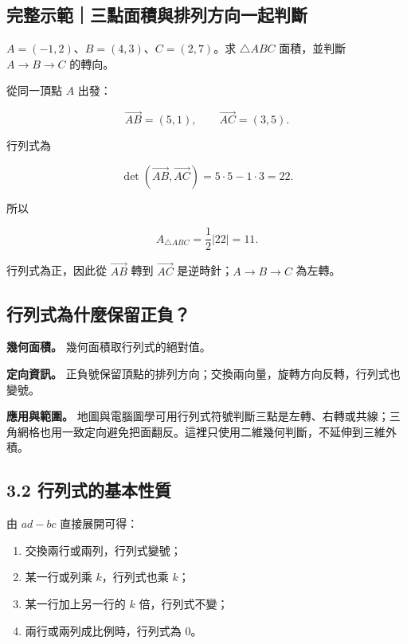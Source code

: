 \documentclass[11pt,a4paper]{article}
\providecommand{\tightlist}{%
  \setlength{\itemsep}{0pt}\setlength{\parskip}{0pt}}
\begin{document}
\begin{HandoutWorkedExample}

\subsection{完整示範｜三點面積與排列方向一起判斷}\label{ux5b8cux6574ux793aux7bc4ux4e09ux9edeux9762ux7a4dux8207ux6392ux5217ux65b9ux5411ux4e00ux8d77ux5224ux65b7}

\(A=(-1,2)\)、\(B=(4,3)\)、\(C=(2,7)\)。求 \(\triangle ABC\) 面積，並判斷 \(A\to B\to C\) 的轉向。

從同一頂點 \(A\) 出發：

\[
\overrightarrow{AB}=(5,1),
\qquad
\overrightarrow{AC}=(3,5).
\]

行列式為

\[
\det(\overrightarrow{AB},\overrightarrow{AC})
=5\cdot5-1\cdot3=22.
\]

所以

\[
A_{\triangle ABC}=\frac12|22|=\boxed{11}.
\]

行列式為正，因此從 \(\overrightarrow{AB}\) 轉到 \(\overrightarrow{AC}\) 是逆時針；\(A\to B\to C\) 為左轉。

\end{HandoutWorkedExample}

\subsection{行列式為什麼保留正負？}\label{ux884cux5217ux5f0fux70baux4ec0ux9ebcux4fddux7559ux6b63ux8ca0}

\textbf{幾何面積。} 幾何面積取行列式的絕對值。

\textbf{定向資訊。} 正負號保留頂點的排列方向；交換兩向量，旋轉方向反轉，行列式也變號。

\textbf{應用與範圍。} 地圖與電腦圖學可用行列式符號判斷三點是左轉、右轉或共線；三角網格也用一致定向避免把面翻反。這裡只使用二維幾何判斷，不延伸到三維外積。

\subsection{3.2 行列式的基本性質}\label{ux884cux5217ux5f0fux7684ux57faux672cux6027ux8cea}

由 \(ad-bc\) 直接展開可得：

\begin{enumerate}
\def\labelenumi{\arabic{enumi}.}
\tightlist
\item
  交換兩行或兩列，行列式變號；
\item
  某一行或列乘 \(k\)，行列式也乘 \(k\)；
\item
  某一行加上另一行的 \(k\) 倍，行列式不變；
\item
  兩行或兩列成比例時，行列式為 \(0\)。
\end{enumerate}
\end{document}
